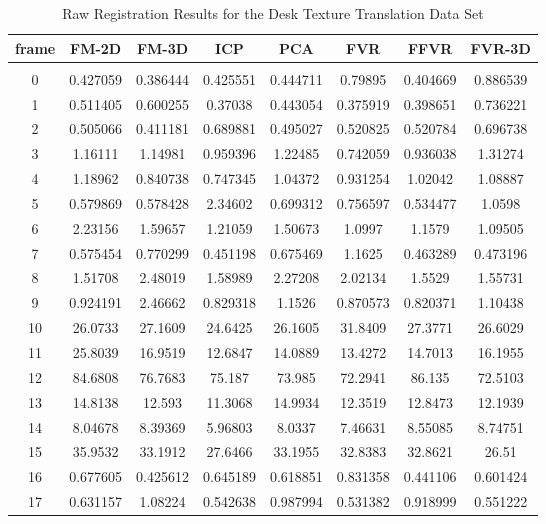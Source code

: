\begin{center}
\begin{longtable}{cccccccc}
\caption{Raw Registration Results for the Desk Texture Translation Data Set}
\label{tab:desktexturetranslationFULL}
\endfirsthead
\endhead
\textbf{frame} & \textbf{FM-2D} & \textbf{FM-3D} & \textbf{ICP} & \textbf{PCA} & \textbf{FVR} & \textbf{FFVR} & \textbf{FVR-3D} \\
\hline \\
0 & 0.427059 & 0.386444 & 0.425551 & 0.444711 & 0.79895 & 0.404669 & 0.886539\\
1 & 0.511405 & 0.600255 & 0.37038 & 0.443054 & 0.375919 & 0.398651 & 0.736221\\
2 & 0.505066 & 0.411181 & 0.689881 & 0.495027 & 0.520825 & 0.520784 & 0.696738\\
3 & 1.16111 & 1.14981 & 0.959396 & 1.22485 & 0.742059 & 0.936038 & 1.31274\\
4 & 1.18962 & 0.840738 & 0.747345 & 1.04372 & 0.931254 & 1.02042 & 1.08887\\
5 & 0.579869 & 0.578428 & 2.34602 & 0.699312 & 0.756597 & 0.534477 & 1.0598\\
6 & 2.23156 & 1.59657 & 1.21059 & 1.50673 & 1.0997 & 1.1579 & 1.09505\\
7 & 0.575454 & 0.770299 & 0.451198 & 0.675469 & 1.1625 & 0.463289 & 0.473196\\
8 & 1.51708 & 2.48019 & 1.58989 & 2.27208 & 2.02134 & 1.5529 & 1.55731\\
9 & 0.924191 & 2.46662 & 0.829318 & 1.1526 & 0.870573 & 0.820371 & 1.10438\\
10 & 26.0733 & 27.1609 & 24.6425 & 26.1605 & 31.8409 & 27.3771 & 26.6029\\
11 & 25.8039 & 16.9519 & 12.6847 & 14.0889 & 13.4272 & 14.7013 & 16.1955\\
12 & 84.6808 & 76.7683 & 75.187 & 73.985 & 72.2941 & 86.135 & 72.5103\\
13 & 14.8138 & 12.593 & 11.3068 & 14.9934 & 12.3519 & 12.8473 & 12.1939\\
14 & 8.04678 & 8.39369 & 5.96803 & 8.0337 & 7.46631 & 8.55085 & 8.74751\\
15 & 35.9532 & 33.1912 & 27.6466 & 33.1955 & 32.8383 & 32.8621 & 26.51\\
16 & 0.677605 & 0.425612 & 0.645189 & 0.618851 & 0.831358 & 0.441106 & 0.601424\\
17 & 0.631157 & 1.08224 & 0.542638 & 0.987994 & 0.531382 & 0.918999 & 0.551222\\

\end{longtable}
\end{center}
